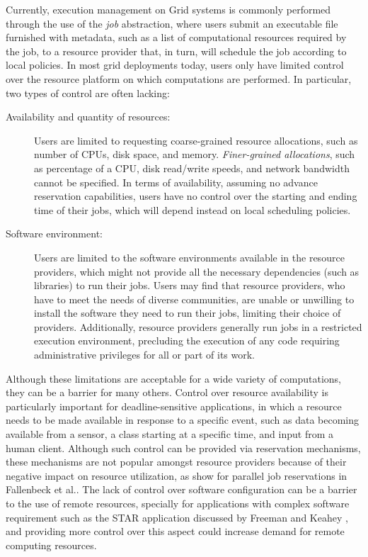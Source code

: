 Currently, execution management on Grid systems \cite{gridbook} is commonly performed through the use of the \emph{job} abstraction, where users submit an executable file furnished with metadata, such as a list of computational resources required by the job, to a resource provider that, in turn, will schedule the job according to local policies. In most grid deployments today, users only have limited control over the resource platform on which computations are performed. In particular, two types of control are often lacking:

\begin{description}
\item[Availability and quantity of resources:] Users are limited to requesting coarse-grained resource allocations, such as number of CPUs, disk space, and memory. \emph{Finer-grained allocations}, such as percentage of a CPU, disk read/write speeds, and network bandwidth cannot be specified. In terms of availability, assuming no advance reservation capabilities, users have no control over the starting and ending time of their jobs, which will depend instead on local scheduling policies.
\item[Software environment:] Users are limited to the software environments available in the resource providers, which might not provide all the necessary dependencies (such as libraries) to run their jobs. Users may find that resource providers, who have to meet the needs of diverse communities, are unable or unwilling to install the software they need to run their jobs, limiting their choice of providers. Additionally, resource providers generally run jobs in a restricted execution environment, precluding the execution of any code requiring administrative privileges for all or part of its work.
\end{description}

Although these limitations are acceptable for a wide variety of computations, they can be a barrier for many others. Control over resource availability is particularly important for deadline{}-sensitive applications, in which a resource needs to be made available in response to a specific event, such as data becoming available from a sensor, a class starting at a specific time, and input from a human client. Although such control can be provided via reservation mechanisms, these mechanisms are not popular amongst resource providers because of their negative impact on resource utilization, as show for parallel job reservations in Fallenbeck et al.\cite{xge}. The lack of control over software configuration can be a barrier to the use of remote resources, specially for applications with complex software requirement such as the STAR application discussed by Freeman and Keahey \cite{star}, and providing more control over this aspect could increase demand for remote computing resources.

